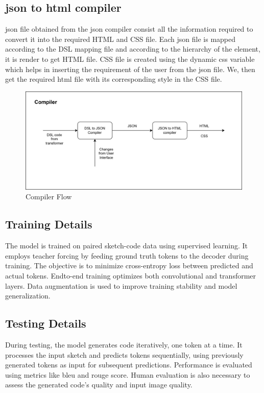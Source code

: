 \documentclass{ioereport}
\begin{document}
\subsection{\gls{json} to \gls{html} compiler}
\gls{json} file obtained from the \gls{json} compiler consist all the information required to convert it into the required 
HTML and CSS file. Each \gls{json} file is mapped according to the DSL mapping file and according to the hierarchy of the 
element, it is render to get HTML file. CSS file is created using the dynamic \gls{css} variable which helps in inserting 
the requirement of the user from the \gls{json} file. We, then get the required html file with its corresponding style in the CSS file.

\begin{figure}[H]
    \centering
           \includegraphics[scale=0.15, trim=100 200 200 0]{images/compiler flow.jpeg}
           \caption{Compiler Flow}
           \label{fig:Compflow}
       \end{figure}
   
 \subsection{Training Details}
The model is trained on paired sketch-code data using supervised learning. It employs
teacher forcing by feeding ground truth tokens to the decoder during training. The
objective is to minimize cross-entropy loss between predicted and actual tokens. Endto-end training optimizes both convolutional and transformer layers. Data augmentation
is used to improve training stability and model generalization.
\subsection{Testing Details}
During testing, the model generates code iteratively, one token at a time. It processes
the input sketch and predicts tokens sequentially, using previously generated tokens as
input for subsequent predictions. Performance is evaluated using metrics like \gls{bleu}
and \gls{rouge} score. Human evaluation is also necessary to assess the generated code's
quality and input image quality.
\pagebreak
\end{document}

